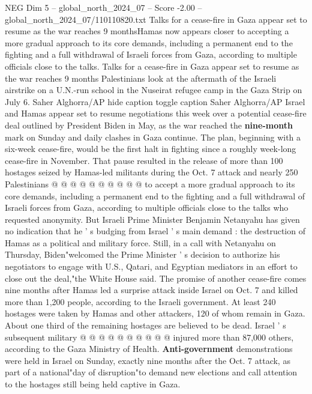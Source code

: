 \begin{textsample}{NEG Dim 5 – global\_north\_2024\_07 – Score -2.00 – global\_north\_2024\_07/110110820.txt}  \label{ex:f5_neg_141}
Talks for a cease-fire in Gaza appear set to resume as the war reaches 9 monthsHamas now appears closer to accepting a more gradual approach to its core demands, including a permanent end to the fighting and a full withdrawal of Israeli forces from Gaza, according to multiple officials close to the talks.
Talks for a cease-fire in Gaza appear set to resume as the war reaches 9 months Palestinians look at the aftermath of the Israeli airstrike on a U.N.-run school in the Nuseirat refugee camp in the Gaza Strip on July 6.
Saher Alghorra/AP hide caption toggle caption Saher Alghorra/AP Israel and Hamas appear set to resume negotiations this week over a potential cease-fire deal outlined by President Biden in May, as the war reached the \textbf{nine-month} mark on Sunday and daily clashes in Gaza continue.
The plan, beginning with a six-week cease-fire, would be the first halt in fighting since a roughly week-long cease-fire in November.
That pause resulted in the release of more than 100 hostages seized by Hamas-led militants during the Oct. 7 attack and nearly 250 Palestinians @ @ @ @ @ @ @ @ @ @ to accept a more gradual approach to its core demands, including a permanent end to the fighting and a full withdrawal of Israeli forces from Gaza, according to multiple officials close to the talks who requested anonymity.
But Israeli Prime Minister Benjamin Netanyahu has given no indication that he ' s budging from Israel ' s main demand : the destruction of Hamas as a political and military force.
Still, in a call with Netanyahu on Thursday, Biden"welcomed the Prime Minister ' s decision to authorize his negotiators to engage with U.S., Qatari, and Egyptian mediators in an effort to close out the deal,"the White House said.
The promise of another cease-fire comes nine months after Hamas led a surprise attack inside Israel on Oct. 7 and killed more than 1,200 people, according to the Israeli government.
At least 240 hostages were taken by Hamas and other attackers, 120 of whom remain in Gaza.
About one third of the remaining hostages are believed to be dead.
Israel ' s subsequent military @ @ @ @ @ @ @ @ @ @ injured more than 87,000 others, according to the Gaza Ministry of Health. \textbf{Anti-government} demonstrations were held in Israel on Sunday, exactly nine months after the Oct. 7 attack, as part of a national"day of disruption"to demand new elections and call attention to the hostages still being held captive in Gaza.

\end{textsample}
